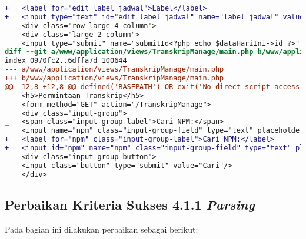 \begin{lstlisting}[frame=single, label={lst:perbaikan_3.3.2_label_masukan}, language=diff, caption=Perbaikan Kriteria Sukses 3.3.2]
+   <label for="edit_label_jadwal">Label</label>
+   <input type="text" id="edit_label_jadwal" name="label_jadwal" value="<?php echo $dataHariIni->label; ?>"><br> 
    <div class="row large-4 column">
    <div class="large-2 column">
    <input type="submit" name="submitId<?php echo $dataHariIni->id ?>" class="button" value="Save  ">
diff --git a/www/application/views/TranskripManage/main.php b/www/application/views/TranskripManage/main.php
index 0970fc2..6dffa7d 100644
--- a/www/application/views/TranskripManage/main.php
+++ b/www/application/views/TranskripManage/main.php
@@ -12,8 +12,8 @@ defined('BASEPATH') OR exit('No direct script access allowed');
    <h5>Permintaan Transkrip</h5>
    <form method="GET" action="/TranskripManage">
    <div class="input-group">
_   <span class="input-group-label">Cari NPM:</span>
_   <input name="npm" class="input-group-field" type="text" placeholder="2013730013" maxlength="10" minlength="10"<?= $npmQuery === NULL ? '' : " value='$npmQuery'" ?>/>
+   <label for="npm" class="input-group-label">Cari NPM:</label>
+   <input id="npm" name="npm" class="input-group-field" type="text" placeholder="2013730013" maxlength="10" minlength="10"<?= $npmQuery === NULL ? '' : " value='$npmQuery'" ?>/>
    <div class="input-group-button">
    <input class="button" type="submit" value="Cari"/>
    </div>
\end{lstlisting} 

\subsection{Perbaikan Kriteria Sukses 4.1.1 \textit{Parsing}}
\label{subsec:perbaikan_kriteria_sukses_4.1.1}
Pada bagian ini dilakukan perbaikan sebagai berikut:

